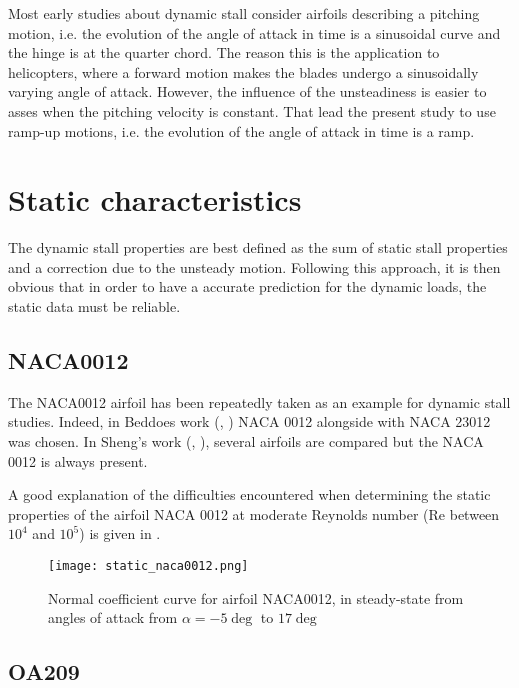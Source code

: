 Most early studies about dynamic stall consider airfoils describing a pitching motion, i.e. the evolution of the angle of attack in time is a sinusoidal curve and the hinge is at the quarter chord. The reason this is the application to helicopters, where a forward motion makes the blades undergo a sinusoidally varying angle of attack. However, the influence of the unsteadiness is easier to asses when the pitching velocity is constant. That lead the present study to use ramp-up motions, i.e. the evolution of the angle of attack in time is a ramp. 

\section{Static characteristics}

The dynamic stall properties are best defined as the sum of static stall properties and a correction due to the unsteady motion. Following this approach, it is then obvious that in order to have a accurate prediction for the dynamic loads, the static data must be reliable. 

\subsection{NACA0012}

The NACA0012 airfoil has been repeatedly taken as an example for dynamic stall studies. Indeed, in Beddoes work (\cite{beddoes_representation_1983}, \cite{leishman_semi-empirical_1989}) NACA 0012 alongside with NACA 23012 was chosen. In Sheng's work (\cite{sheng_new_2006}, \cite{sheng_improved_2007}), several airfoils are compared but the NACA 0012 is always present.

A good explanation of the difficulties encountered when determining the static properties of the airfoil NACA 0012 at moderate Reynolds number (Re between $10^4$ and $10^5$) is given in \cite{tank_possibility_2017}.

\begin{wrapfigure}{r}{10cm}
\centering
\texttt{[image: static\_naca0012.png]}
\caption{Normal coefficient curve for airfoil NACA0012, in steady-state from angles of attack from $\alpha=-5 \deg$ to $17 \deg$}
\label{fig:static_flatplate}
\end{wrapfigure}


\subsection{OA209}

